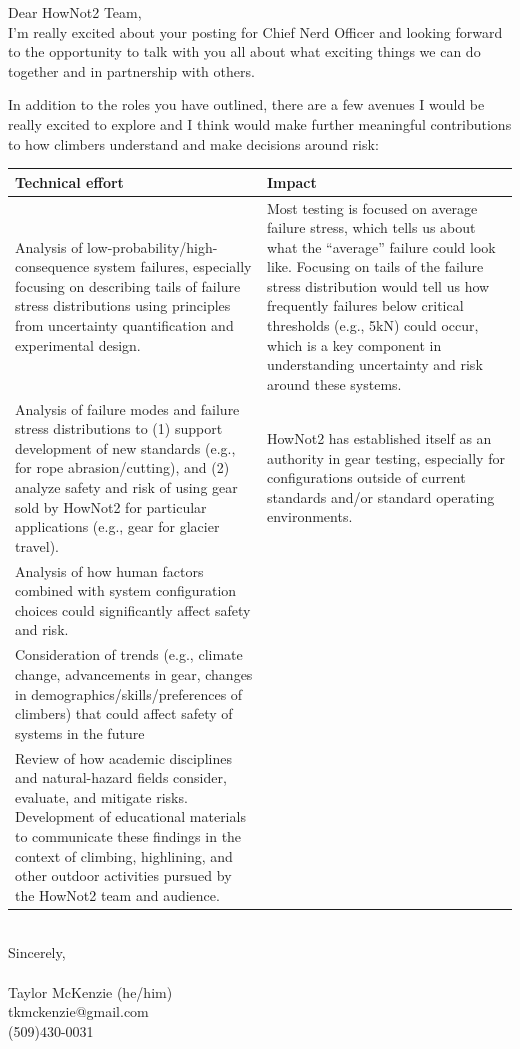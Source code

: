 \documentclass[10pt]{article}
\begin{document}
	

\noindent Dear HowNot2 Team,\\

I'm really excited about your posting for Chief Nerd Officer and looking forward to the opportunity to talk with you all about what exciting things we can do together and in partnership with others.

In addition to the roles you have outlined, there are a few avenues I would be really excited to explore and I think would make further meaningful contributions to how climbers understand and make decisions around risk:
\begin{center}
\begin{tabular}{|p{0.5\linewidth}|p{0.5\linewidth}|}
\hline
\textbf{Technical effort} & \textbf{Impact} \\ \hline \hline
Analysis of low-probability/high-consequence system failures, especially focusing on describing tails of failure stress distributions using principles from uncertainty quantification and experimental design. & Most testing is focused on average failure stress, which tells us about what the ``average'' failure could look like. Focusing on tails of the failure stress distribution would tell us how frequently failures below critical thresholds (e.g., 5kN) could occur, which is a key component in understanding uncertainty and risk around these systems. \\ \hline
Analysis of failure modes and failure stress distributions to (1) support development of new standards (e.g., for rope abrasion/cutting), and (2) analyze safety and risk of using gear sold by HowNot2 for particular applications (e.g., gear for glacier travel). & HowNot2 has established itself as an authority in gear testing, especially for configurations outside of current standards and/or standard operating environments. \\ \hline
Analysis of how human factors combined with system configuration choices could significantly affect safety and risk. & \\ \hline
Consideration of trends (e.g., climate change, advancements in gear, changes in demographics/skills/preferences of climbers) that could affect safety of systems in the future & \\ \hline
Review of how academic disciplines and natural-hazard fields consider, evaluate, and mitigate risks. Development of educational materials to communicate these findings in the context of climbing, highlining, and other outdoor activities pursued by the HowNot2 team and audience. & \\ \hline
\end{tabular}
\end{center}

\noindent \\Sincerely,\\\\
Taylor McKenzie (he/him)\\
tkmckenzie@gmail.com\\
(509)430-0031
\end{document}
